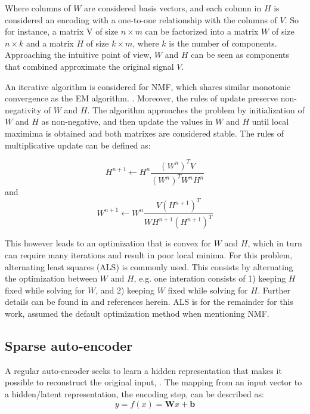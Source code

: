 \documentclass{article}
\begin{document}
Where columns of $W$ are considered basis vectors, and each column in $H$ is considered an encoding with a one-to-one relationship with the columns of $V$. So for instance, a matrix V of size $n \times m$ can be factorized into a matrix $W$ of size $n \times k$ and a matrix $H$ of size $k \times m$, where $k$ is the number of components. Approaching the intuitive point of view, $W$ and $H$ can be seen as components that combined approximate the original signal $V$.

An iterative algorithm is considered for NMF, which shares similar monotonic convergence as the EM algorithm. \cite{Dempster1977}. Moreover, the rules of update preserve non-negativity of $W$ and $H$. The algorithm approaches the problem by initialization of $W$ and $H$ as non-negative, and then update the values in $W$ and $H$ until local maximima is obtained and both matrixes are considered stable. The rules of multiplicative update can be defined as:

\begin{equation}
H^{n+1} \leftarrow H^{n} \frac{(W^n)^TV}{(W^n)^TW^nH^n}
\end{equation}
and 
\begin{equation}
W^{n+1} \leftarrow W^{n} \frac{V(H^{n+1})^T}{WH^{n+1}(H^{n+1})^T}
\end{equation}

This however leads to an optimization that is convex for $W$ and $H$, which in turn can require many iterations and result in poor local minima. For this problem, alternating least squares (ALS) is commonly used. This consists by alternating the optimization between $W$ and $H$, e.g. one interation consists of 1) keeping $H$ fixed while solving for $W$, and 2) keeping $W$ fixed while solving for $H$. Further details can be found in  \cite{Langville2014} and references herein. ALS is for the remainder for this work, assumed the default optimization method when mentioning NMF.

\subsection{Sparse auto-encoder}
A regular auto-encoder seeks to learn a hidden representation that makes it possible to reconstruct the original input, \cite{Vincent}. The mapping from an input vector to a hidden/latent representation, the encoding step, can be described as:
\begin{equation}
y = f(x) = \mathbf{W}x + \mathbf{b}
\end{equation}
\end{document}
